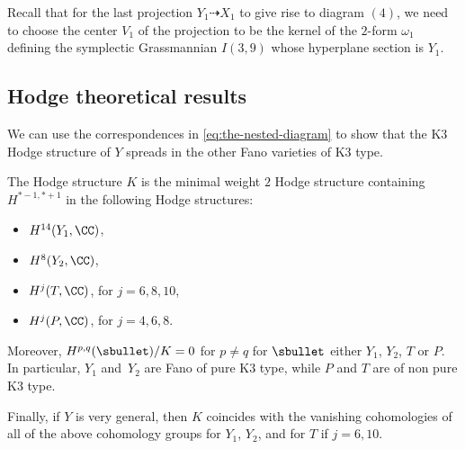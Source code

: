 Recall that for the last projection $Y_1 \dashrightarrow X_1$ to give rise to diagram $(4)$, we need to choose the center $V_1$ of the projection to be the kernel of the $2$-form $\omega_1$ defining the symplectic Grassmannian $I(3,9)$ whose hyperplane section is $Y_1$.

\subsection{Hodge theoretical results}
We can use the correspondences in \eqref{eq:the-nested-diagram} to show that the K3 Hodge structure of
$Y$ spreads in the other Fano varieties of K3 type.

\begin{theorem}\label{K}
The Hodge structure $K$ is the minimal weight $2$ Hodge structure containing $H^{*-1,*+1}$ in the following Hodge structures:
\begin{itemize}
\item $H^{14}(Y_1,\CC)$,
\item $H^8(Y_2,\CC)$,
\item $H^j(T,\CC)$, for $j=6,8,10$,
\item $H^j(P,\CC)$, for $j=4,6,8$.
\end{itemize}
Moreover, $H^{p,q}(\sbullet)/ K = 0$ for $p\neq q$ for $\sbullet$ either $Y_1$, $Y_2$, $T$ or $P$. In particular, $Y_1$ and~$Y_2$ are Fano of pure K3 type, while $P$ and $T$ are
of non pure K3 type.

Finally, if $Y$ is very general, then $K$ coincides with the vanishing cohomologies of all of the above cohomology groups for $Y_1$, $Y_2$, and for $T$ if $j=6,10$.
\end{theorem}

